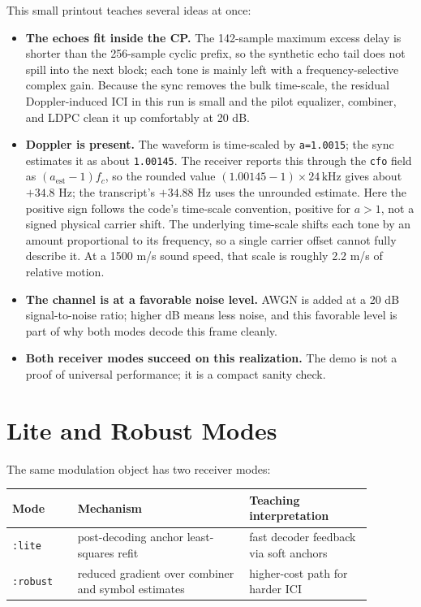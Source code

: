 \documentclass[11pt]{article}
\newcommand{\code}[1]{\texttt{#1}}
\begin{document}
This small printout teaches several ideas at once:
\begin{itemize}
  \item \textbf{The echoes fit inside the CP.} The 142-sample maximum excess
        delay is shorter than the 256-sample cyclic prefix, so the synthetic
        echo tail does not spill into the next block; each tone is mainly left
        with a frequency-selective complex gain. Because the sync removes the
        bulk time-scale, the residual Doppler-induced ICI in this run is small
        and the pilot equalizer, combiner, and LDPC clean it up comfortably at
        20 dB.
  \item \textbf{Doppler is present.} The waveform is time-scaled by
        \code{a=1.0015}; the sync estimates it as about \code{1.00145}. The
        receiver reports this through the \code{cfo} field as
        \((a_{\mathrm{est}}-1)f_c\), so the rounded value
        \((1.00145-1)\times24\,\mathrm{kHz}\) gives about \(+34.8\) Hz; the
        transcript's \(+34.88\) Hz uses the unrounded estimate. Here the
        positive sign follows the code's time-scale convention, positive for
        \(a>1\), not a signed physical carrier shift. The underlying time-scale
        shifts each tone by an amount proportional to its frequency, so a single
        carrier offset cannot fully describe it. At a 1500 m/s sound speed, that
        scale is roughly 2.2 m/s of relative motion.
  \item \textbf{The channel is at a favorable noise level.} AWGN is added at a 20 dB
        signal-to-noise ratio; higher dB means less noise, and this favorable
        level is part of why both modes decode this frame cleanly.
  \item \textbf{Both receiver modes succeed on this realization.} The demo is
        not a proof of universal performance; it is a compact sanity check.
\end{itemize}

\section{Lite and Robust Modes}

The same modulation object has two receiver modes:
\begin{center}
\begin{tabular}{p{0.16\linewidth}p{0.42\linewidth}p{0.30\linewidth}}
\toprule
Mode & Mechanism & Teaching interpretation \\
\midrule
\code{:lite} & post-decoding anchor least-squares refit & fast decoder feedback via soft anchors \\
\code{:robust} & reduced gradient over combiner and symbol estimates & higher-cost path for harder ICI \\
\bottomrule
\end{tabular}
\end{center}
\end{document}
